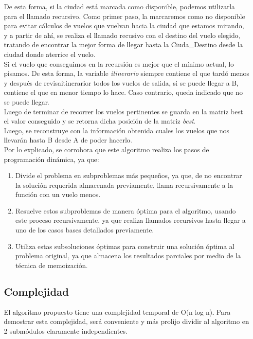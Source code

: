 De esta forma, si la ciudad está marcada como disponible, podemos utilizarla para el llamado recursivo. Como primer paso, la marcaremos como no disponible para evitar cálculos de vuelos que vuelvan hacia la ciudad que estamos mirando, y a partir de ahí, se realiza el llamado recusivo con el destino del vuelo elegido, tratando de encontrar la mejor forma de llegar hasta la Ciuda\_Destino desde la ciudad donde aterrice el vuelo.\\

Si el vuelo que conseguimos en la recursión es mejor que el mínimo actual, lo pisamos. De esta forma, la variable \textit{itinerario} siempre contiene el que tardó menos y después de revisaitinerarior todos los vuelos de salida, si se puede llegar a B, contiene el que en menor tiempo lo hace. Caso contrario, queda indicado que no se puede llegar.\\

Luego de terminar de recorrer los vuelos pertinentes se guarda en la matriz best el valor conseguido  y se retorna dicha posición de la matriz \textit{best}.\\

Luego, se reconstruye con la información obtenida cuales los vuelos que nos llevarán hasta B desde A de poder hacerlo.\\

\newpage
Por lo explicado, se corrobora que este algoritmo realiza los pasos de programación dinámica, ya que:\\

\begin{enumerate}
\item Divide el problema en subproblemas más pequeños, ya que, de no encontrar la solución requerida almacenada previamente, llama recursivamente a la función con un vuelo menos.

\item Resuelve estos subproblemas de manera óptima para el algoritmo, usando este proceso recursivamente, ya que realiza llamados recursivos hasta llegar a uno de los casos bases detallados previamente.

\item Utiliza estas subsoluciones óptimas para construir una solución óptima al problema original, ya que almacena los resultados parciales por medio de la técnica de memoización.

\end{enumerate}



\newpage
\subsection{Complejidad}
\noindent El algoritmo propuesto tiene una complejidad temporal de O(n log n). Para demostrar esta complejidad, será conveniente y más prolijo dividir al algoritmo en 2 submódulos claramente independientes.

